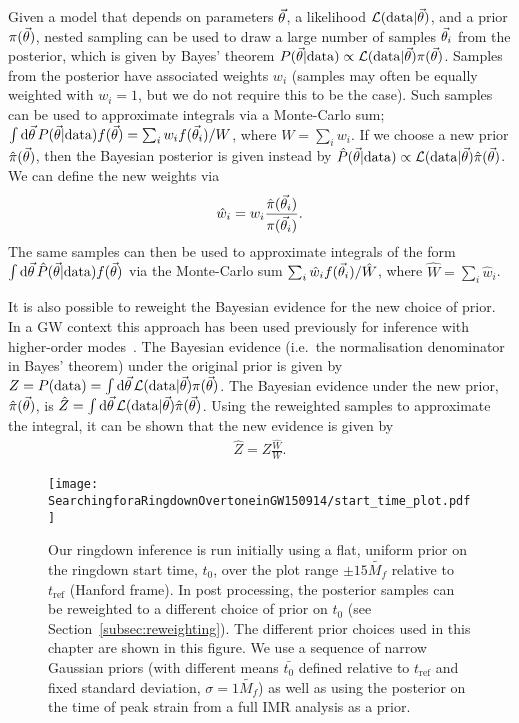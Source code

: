 Given a model that depends on parameters $\vec{\theta}$, a likelihood $\mathcal{L}(\mathrm{data}|\vec{\theta})$, and a prior $\pi(\vec{\theta})$, nested sampling can be used to draw a large number of samples $\vec{\theta}_i$ from the posterior, which is given by Bayes' theorem $P(\vec{\theta}|\mathrm{data})\propto \mathcal{L}(\mathrm{data}|\vec{\theta}) \pi(\vec{\theta})$.
Samples from the posterior have associated weights $w_i$ (samples may often be equally weighted with $w_i=1$, but we do not require this to be the case). 
Such samples can be used to approximate integrals via a Monte-Carlo sum; $\int \mathrm{d}\vec{\theta}\,P(\vec{\theta}|\mathrm{data})f(\vec{\theta})=\sum_{i}w_i f(\vec{\theta}_i)/W$, where $W=\sum_{i}w_i$.
If we choose a new prior $\hat{\pi}(\vec{\theta})$, then the Bayesian posterior is given instead by $\hat{P}(\vec{\theta}|\mathrm{data})\propto \mathcal{L}(\mathrm{data}|\vec{\theta}) \hat{\pi}(\vec{\theta})$.
We can define the new weights via
\begin{align}
	\hat{w}_i = w_i \frac{\hat{\pi}(\vec{\theta}_i)}{\pi(\vec{\theta}_i)}.
\end{align}
The same samples can then be used to approximate integrals of the form $\int \mathrm{d}\vec{\theta}\,\hat{P}(\vec{\theta}|\mathrm{data})f(\vec{\theta})$ via the Monte-Carlo sum $\sum_{i}\hat{w}_i f(\vec{\theta}_i)/\hat{W}$, where $\hat{W}=\sum_{i}\hat{w}_i$.

It is also possible to reweight the Bayesian evidence for the new choice of prior.
In a GW context this approach has been used previously for inference with higher-order modes~\cite{Payne:2019wmy}.
The Bayesian evidence (i.e.\ the normalisation denominator in Bayes' theorem) under the original prior is given by $Z=P(\mathrm{data})=\int\mathrm{d}\vec{\theta}\,\mathcal{L}(\mathrm{data}|\vec{\theta})\pi(\vec{\theta})$.
The Bayesian evidence under the new prior, $\hat{\pi}(\vec{\theta})$, is $\hat{Z}=\int\mathrm{d}\vec{\theta}\,\mathcal{L}(\mathrm{data}|\vec{\theta})\hat{\pi}(\vec{\theta})$. Using the reweighted samples to approximate the integral, it can be shown that the new evidence is given by
\begin{align}\label{eq:new_evidence}
	\hat{Z} = Z\frac{\hat{W}}{W}.
\end{align}

\begin{figure}[t]
    \centering
    \texttt{[image: SearchingforaRingdownOvertoneinGW150914/start\_time\_plot.pdf]}
    \caption[Priors on the ringdown start time used for the GW150914 analysis]{ 
    Our ringdown inference is run initially using a flat, uniform prior on the ringdown start time, $t_0$, over the plot range $\pm 15 \tilde{M_f}$ relative to $t_\mathrm{ref}$ (Hanford frame).
    In post processing, the posterior samples can be reweighted to a different choice of prior on $t_0$ (see Section~\ref{subsec:reweighting}). 
    The different prior choices used in this chapter are shown in this figure. 
    We use a sequence of narrow Gaussian priors (with different means $\bar{t_0}$ defined relative to $t_\mathrm{ref}$ and fixed standard deviation, $\sigma=1\tilde{M_f}$) as well as using the posterior on the time of peak strain from a full IMR analysis as a prior.
    }
    \label{fig:start_time}
\end{figure}


